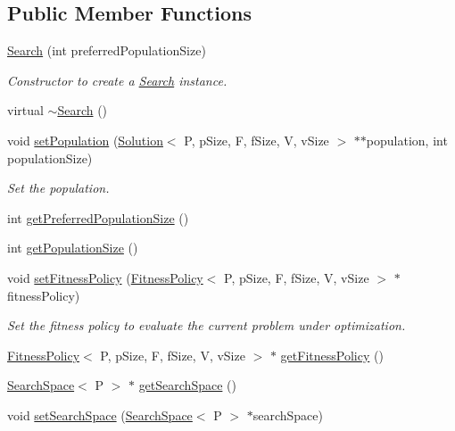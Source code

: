 \subsection*{Public Member Functions}
\begin{DoxyCompactItemize}
\item 
\hyperlink{classSearch_a3d2ac362f460ce086fa7e894ebca4de0}{Search} (int preferred\+Population\+Size)
\begin{DoxyCompactList}\small\item\em Constructor to create a \hyperlink{classSearch}{Search} instance. \end{DoxyCompactList}\item 
virtual \hyperlink{classSearch_a98ef12ebef10a49b31183a37783eba97}{$\sim$\+Search} ()
\item 
void \hyperlink{classSearch_a06246066740a703454189564dc5c326e}{set\+Population} (\hyperlink{classSolution}{Solution}$<$ P, p\+Size, F, f\+Size, V, v\+Size $>$ $\ast$$\ast$population, int population\+Size)
\begin{DoxyCompactList}\small\item\em Set the population. \end{DoxyCompactList}\item 
int \hyperlink{classSearch_abba88e2201e9558aee21e574af9991f5}{get\+Preferred\+Population\+Size} ()
\item 
int \hyperlink{classSearch_ab83e643822f70e74ec6ee7e81512c886}{get\+Population\+Size} ()
\item 
void \hyperlink{classSearch_a8caad8e1c1da6ce9c85285fbf1c3b6d1}{set\+Fitness\+Policy} (\hyperlink{classFitnessPolicy}{Fitness\+Policy}$<$ P, p\+Size, F, f\+Size, V, v\+Size $>$ $\ast$fitness\+Policy)
\begin{DoxyCompactList}\small\item\em Set the fitness policy to evaluate the current problem under optimization. \end{DoxyCompactList}\item 
\hyperlink{classFitnessPolicy}{Fitness\+Policy}$<$ P, p\+Size, F, f\+Size, V, v\+Size $>$ $\ast$ \hyperlink{classSearch_a39d6e69d2b1573ba4564819eeee1cb4e}{get\+Fitness\+Policy} ()
\item 
\hyperlink{classSearchSpace}{Search\+Space}$<$ P $>$ $\ast$ \hyperlink{classSearch_ad2d5be608164b67b1fb055b0162f4e88}{get\+Search\+Space} ()
\item 
void \hyperlink{classSearch_af9f46406f1f1f7f89ab294c155738ca6}{set\+Search\+Space} (\hyperlink{classSearchSpace}{Search\+Space}$<$ P $>$ $\ast$search\+Space)
$$
\end{DoxyCompactItemize}
